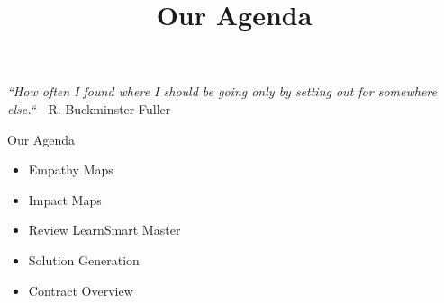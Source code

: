 \documentclass{ximera}
\title{Our Agenda}
\begin{document}
\begin{abstract}

\end{abstract}
\maketitle

\emph{``How often I found where I should be going only by setting out for somewhere else.``} - R. Buckminster Fuller

Our Agenda
\begin{itemize}
  \item Empathy Maps
  \item Impact Maps
  \item Review LearnSmart Master
  \item Solution Generation
  \item Contract Overview
\end{itemize}
\end{document}
